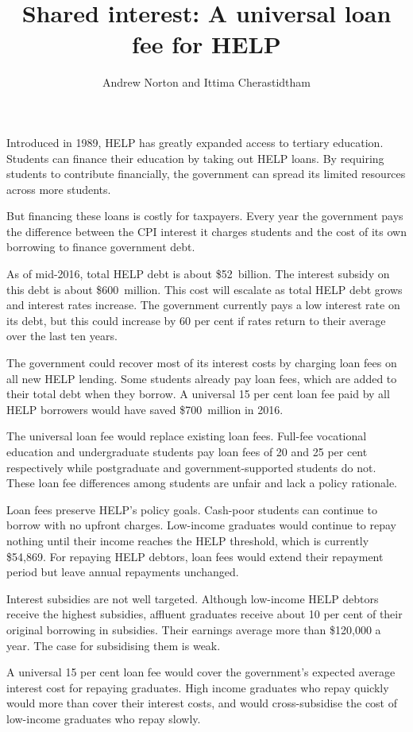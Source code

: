 \documentclass[embargoed]{grattan}
\title{Shared interest: A universal loan fee for \gls{HELP}}
\author{Andrew Norton and Ittima Cherastidtham}
\begin{document}
\setlength{\overviewExtra}{-2pt}
\begin{overview}
Introduced in 1989, \gls{HELP} has greatly expanded access to tertiary education.
Students can finance their education by taking out \gls{HELP} loans.
By requiring students to contribute financially, the government can spread its limited resources across more students.

But financing these loans is costly for taxpayers.
Every year the government pays the difference between the \gls{CPI} interest it charges students and the cost of its own borrowing to finance government debt.

As of mid-2016, total \gls{HELP} debt is about \$52~billion.
The interest subsidy on this debt is about \$600~million.
This cost will escalate as total \gls{HELP} debt grows and interest rates increase.
The government currently pays a low interest rate on its debt, but this could increase by 60 per cent if rates return to their average over the last ten years.

The government could recover most of its interest costs by charging loan fees on all new \gls{HELP} lending.
Some students already pay loan fees, which are added to their total debt when they borrow.
A universal 15 per cent loan fee paid by all \gls{HELP} borrowers would have saved \$700~million in 2016.

The universal loan fee would replace existing loan fees.
Full-fee vocational education and undergraduate students pay loan fees of 20 and 25 per cent respectively while postgraduate and government-supported students do not.
These loan fee differences among students are unfair and lack a policy rationale.

Loan fees preserve \gls{HELP}'s policy goals.
Cash-poor students can continue to borrow with no upfront charges.
Low-income graduates would continue to repay nothing until their income reaches the \gls{HELP} threshold, which is currently \$54,869.
For repaying \gls{HELP} debtors, loan fees would extend their repayment period but leave annual repayments unchanged.

Interest subsidies are not well targeted.
Although low-income \gls{HELP} debtors receive the highest subsidies, affluent graduates receive about 10 per cent of their original borrowing in subsidies.
Their earnings average more than \$120,000 a year.
The case for subsidising them is weak.

A universal 15 per cent loan fee would cover the government's expected average interest cost for repaying graduates.
High income graduates who repay quickly would more than cover their interest costs, and would cross-subsidise the cost of low-income graduates who repay slowly.


\end{overview}
\end{document}
